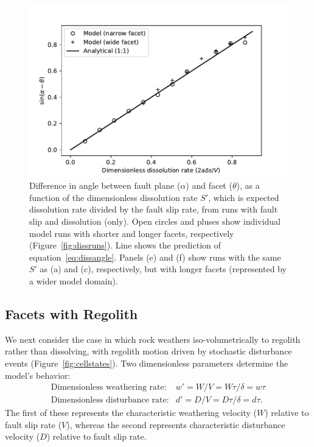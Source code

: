 \begin{figure}[ht!]
\centerline{\includegraphics{Figures/angle_vs_dissolution.pdf}}
\caption{Difference in angle between fault plane ($\alpha$) and facet ($\theta$), as a function of the dimensionless dissolution rate $S'$, which is expected dissolution rate divided by the fault slip rate, from runs with fault slip and dissolution (only). Open circles and pluses show individual model runs with shorter and longer facets, respectively (Figure~\ref{fig:dissruns}). Line shows the prediction of equation~\ref{eq:dissangle}. Panels (e) and (f) show runs with the same $S'$ as (a) and (c), respectively, but with longer facets (represented by a wider model domain).}
\label{fig:angdiss}
\end{figure}

\subsection{Facets with Regolith}

We next consider the case in which rock weathers iso-volumetrically to regolith rather than dissolving, with regolith motion driven by stochastic disturbance events (Figure~\ref{fig:cellstates}). Two dimensionless parameters determine the model's behavior:
\begin{eqnarray*}
\textrm{Dimensionless weathering rate:} & w' = W/V = W\tau/\delta = w\tau \\
\textrm{Dimensionless disturbance rate:} & d' = D/V = D\tau/\delta = d\tau.
\end{eqnarray*}
The first of these represents the characteristic weathering velocity ($W$) relative to fault slip rate ($V$), whereas the second represents characteristic disturbance velocity ($D$) relative to fault slip rate.

